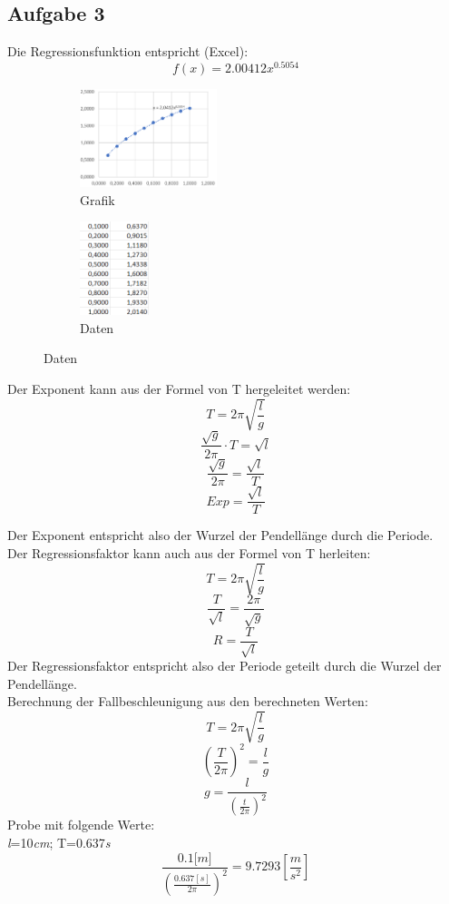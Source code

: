 \documentclass[12pt, a4paper, twoside]{article}
\begin{document}
        \subsection{Aufgabe 3}
        Die Regressionsfunktion entspricht (Excel):
        \[f(x)=2.00412x^{0.5054}\]
        \begin{figure}[h!]
            \begin{subfigure}{.5\textwidth}
                \centering
                \includegraphics[scale=0.25, width=4cm]{Regression.png}
                \caption{Grafik}
                \label{fig:sub1}
            \end{subfigure}%
            \begin{subfigure}{.5\textwidth}
                \centering
                \includegraphics[scale=0.25, width=2cm]{Daten.png}
                \caption{Daten}
                \label{fig:sub2}
            \end{subfigure}
        \end{figure}
        \newpage
        Der Exponent kann aus der Formel von T hergeleitet werden:
        \[T=2\pi \sqrt{\frac{l}{g}}\]
        \[\frac{\sqrt{g}}{2\pi}\cdot T=\sqrt{l}\]
        \[\frac{\sqrt{g}}{2\pi}=\frac{\sqrt{l}}{T}\]
        \[Exp = \frac{\sqrt{l}}{T}\]

        Der Exponent entspricht also der Wurzel der Pendellänge durch die Periode.\\

        Der Regressionsfaktor kann auch aus der Formel von T herleiten:
        \[T=2\pi \sqrt{\frac{l}{g}}\]
        \[\frac{T}{\sqrt{l}}=\frac{2\pi}{\sqrt{g}}\]
        \[R=\frac{T}{\sqrt{l}}\]
        Der Regressionsfaktor entspricht also der Periode geteilt durch die Wurzel der Pendellänge.\\


        Berechnung der Fallbeschleunigung aus den berechneten Werten:
        \[T=2\pi\sqrt{\frac{l}{g}}\]     
        \[(\frac{T}{2\pi})^2=\frac{l}{g}\]
        \[g=\frac{l}{(\frac{t}{2\pi})^2}\]
        Probe mit folgende Werte:\\
        \textit{l}=10\textit{cm}; T=0.637\textit{s}
        \[\frac{0.1\textit{[m]}}{(\frac{0.637[s]}{2\pi})^2}=9.7293 [\frac{m}{s^2}]\]
        \newpage
\end{document}
